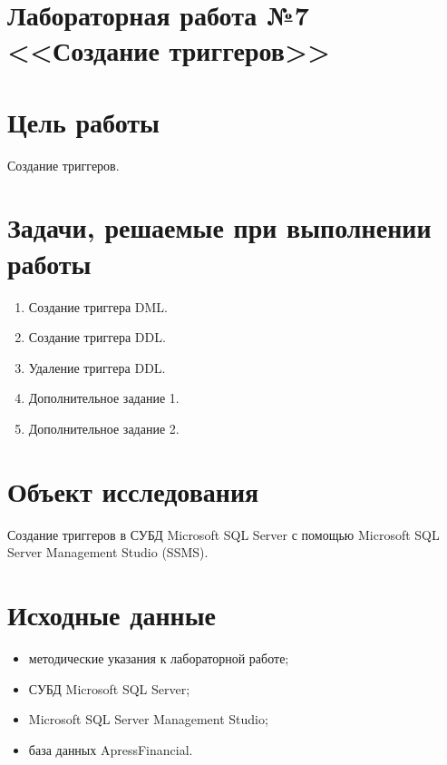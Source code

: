 \documentclass[a4paper, 14pt]{extarticle}
\begin{document}
\setcounter{page}{2}

\linespread{1.5}
\renewcommand{\baselinestretch}{1.5}

\section*{\large{Лабораторная работа №7 <<Создание триггеров>>}}

\section{Цель работы}

Создание триггеров.

\section{Задачи, решаемые при выполнении работы}

\begin{enumerate}[leftmargin=*]
  \item Создание триггера DML.
  \item Создание триггера DDL.
  \item Удаление триггера DDL.
  \item Дополнительное задание 1.
  \item Дополнительное задание 2.
\end{enumerate}

\section{Объект исследования}

Создание триггеров в СУБД \foreignlanguage{english}{Microsoft SQL
  Server} с помощью \foreignlanguage{english}{Microsoft SQL Server Management
  Studio (SSMS)}.

\section{Исходные данные}

\begin{itemize}
  \item методические указания к лабораторной работе;
  \item СУБД Microsoft SQL Server;
  \item Microsoft SQL Server Management Studio;
  \item база данных ApressFinancial.
\end{itemize}
\end{document}
